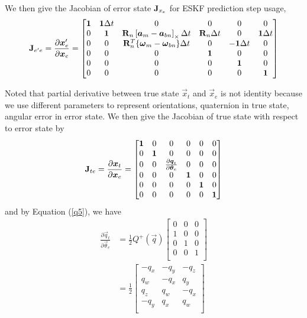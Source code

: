 We then give the Jacobian of error state $\mathbf{J}_{x_e}$ for ESKF prediction step usage,
\begin{equation}\label{f14}
	\mathbf{J}_{e^\prime e} = \frac{\partial{\boldsymbol{x}_e^{\prime}}}{\partial{\boldsymbol{x}_e }} = \begin{bmatrix}
	\mathbf{1} & \mathbf{1}\Delta{t} & 0 & 0 & 0 & 0 \\
	0 & \mathbf{1} & \mathbf{R}_n \left[ \boldsymbol{a}_m - \boldsymbol{a}_{bn} \right]_{\times}\Delta{t} & \mathbf{R}_n\Delta{t} & 0 & \mathbf{1}\Delta{t} \\
	0 & 0 & \mathbf{R}_n^T \{ \boldsymbol{\omega}_m - \boldsymbol{\omega}_{bn} \}\Delta{t} & 0 & -\mathbf{1}\Delta{t} & 0 \\
	0 & 0 & 0 & \mathbf{1} & 0 & 0 \\
	0 & 0 & 0 & 0 & \mathbf{1} & 0 \\
	0 & 0 & 0 & 0 & 0 & \mathbf{1} \\
	\end{bmatrix}
\end{equation}

Noted that partial derivative between true state $\vec{x}_t$ and $\vec{x}_e$ is not identity because we use different parameters to represent orientations, \eg quaternion in true state, angular error in error state. We then give the Jacobian of true state with respect to error state by
\begin{equation}\label{f15}
	\mathbf{J}_{t e} = \frac{\partial{\boldsymbol{x}_t}}{\partial{\boldsymbol{x}_e }} = \begin{bmatrix}
	\mathbf{1} & 0 & 0 & 0 & 0 & 0 \\
	0 & \mathbf{1} &0 & 0 & 0 & 0 \\
	0 & 0 & \frac{\partial{\boldsymbol{q}_t}}{\partial{\boldsymbol{\theta}_e }} & 0 & 0 & 0 \\
	0 & 0 & 0 & \mathbf{1} & 0 & 0 \\
	0 & 0 & 0 & 0 & \mathbf{1} & 0 \\
	0 & 0 & 0 & 0 & 0 & \mathbf{1} \\
	\end{bmatrix}
\end{equation}
and by Equation (\ref{q5}), we have
\begin{align}\label{f16}
	\frac{\partial{\vec{q}_t}}{\partial{\vec{\theta}_e }} &= \frac{1}{2}Q^+(\vec{q})\begin{bmatrix}
	0 & 0 & 0 \\
	1 & 0 & 0 \\
	0 & 1 & 0 \\
	0 & 0 & 1 \\
	\end{bmatrix} \\
	&= \frac{1}{2}\begin{bmatrix}
	-q_x & -q_y & -q_z \\
	q_w & -q_x & q_y \\
	q_z & q_w & -q_x \\
	-q_y & q_x & q_w \\
	\end{bmatrix} \\
\end{align}

